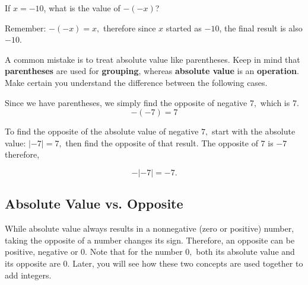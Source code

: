 \documentclass{ximera}[font=12pt]
\begin{document}
\begin{problem}
If $x = -10$, what is the value of $-(-x)$?

\begin{multipleChoice}
\end{multipleChoice}

\begin{feedback}
Remember: $-(-x) = x,$ therefore since $x$ started as $-10$, the final result is also $-10$.
\end{feedback}
\end{problem}


\begin{warning}

A common mistake is to treat absolute value like parentheses. Keep in mind that \textbf{parentheses} are 
used for \textbf{grouping}, whereas \textbf{absolute value} is an \textbf{operation}.  Make certain you 
understand the difference between the following cases.  

\begin{description}[style=nextline, leftmargin=0pt]  %
    \item[Double Negative with Parentheses]

Since we have parentheses, we simply find the opposite of negative $7,$ which is $7.$
\[ -(-7) = 7 \]

\item[Double Negative with Absolute Value]

To find the opposite of the absolute value of negative $7,$ start with the absolute value: $|-7| = 7,$ 
then find the opposite of that result.  The opposite of $7$ is $-7$ therefore,

\[ -|-7| = -7. \]

\end{description}

\end{warning}

\subsection*{Absolute Value vs. Opposite}

While absolute value always results in a nonnegative (zero or positive) number, taking the opposite of a number 
changes its sign.  Therefore, an opposite can be positive, negative or $0.$  Note that for the number $0,$ both 
its absolute value and its opposite are $0.$  Later, you will see how these two concepts are used together to add integers.
\end{document}

